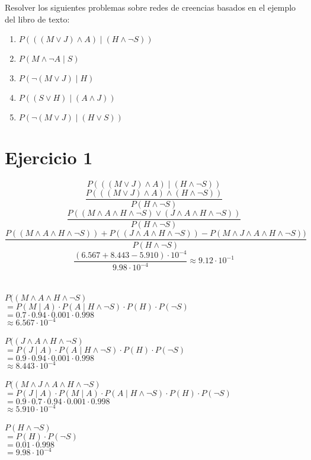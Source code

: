 \documentclass {article}
\begin{document}
Resolver los siguientes problemas sobre redes de creencias basados en el ejemplo del libro de texto:
\begin {enumerate}
	\item $P(((M \lor J) \land A) \mid (H \land \neg S))$
	\item $P (M \land \neg A \mid S)$
	\item $P ( \neg(M \lor J) \mid H)$
	\item $P ( (S \lor H) \mid (A \land J) )$
	\item $P ( \neg(M \lor J) \mid (H \lor S))$
\end {enumerate}

\clearpage
\section {Ejercicio 1}
$$P(((M \lor J) \land A) \mid (H \land \neg S))$$
$$\frac
	{P(((M \lor J) \land A) \land (H \land \neg S))}
	{P(H \land \neg S)}$$
$$\frac
	{P((M \land A \land H \land \neg S) \lor (J \land A \land H \land \neg S))}
	{P(H \land \neg S)}$$
$$\frac
	{P((M \land A \land H \land \neg S) ) + P ( (J \land A \land H \land \neg S)) - P (M \land J \land A \land H \land \neg S))}
	{P(H \land \neg S)}$$
$$\frac
	{(6.567 + 8.443 - 5.910) \cdot 10^{-4}}
	{9.98 \cdot 10^{-4}} \approx 9.12 \cdot 10^{-1}$$
\\
\\
$P((M \land A \land H \land \neg S)$\\
	\indent $
		= P(M \mid A)
		\cdot P(A \mid H \land \neg S)
		\cdot P (H)
		\cdot P(\neg S)$\\
	\indent $
		= 0.7
		\cdot 0.94
		\cdot 0.001
		\cdot 0.998 $\\
	\indent $
		\approx 6.567 \cdot 10^{-4}$
\\
\\
$P((J \land A \land H \land \neg S) $\\
	\indent $ 
		= P(J \mid A)
		\cdot P(A \mid H \land \neg S)
		\cdot P (H)
		\cdot P(\neg S)$\\
	\indent $
		= 0.9
		\cdot 0.94 
		\cdot 0.001 
		\cdot 0.998 $\\
	\indent $
		\approx 8.443 \cdot 10^{-4} $
\\
\\
$P((M \land J \land A \land H \land \neg S)$\\
	\indent $ 
		= P(J \mid A) 
		\cdot P(M \mid A) 
		\cdot P(A \mid H \land \neg S) 
		\cdot P (H) 
		\cdot P(\neg S)$\\
	\indent$ 
		= 0.9 
		\cdot 0.7 
		\cdot 0.94 
		\cdot 0.001 
		\cdot 0.998 $\\
	\indent $
		\approx 5.910 \cdot 10^{-4} $
\\
\\
$P(H \land \neg S)$\\
	\indent $ 
		= P(H) 
		\cdot P(\neg S)$\\
	\indent 
		$ = 0.01 
		\cdot 0.998 $\\
	\indent $
		= 9.98 
		\cdot 10^{-4}$
\end{document}
